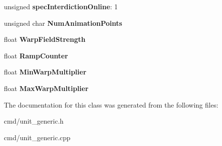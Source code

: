 \begin{DoxyCompactItemize}
\item 
unsigned {\bfseries spec\+Interdiction\+Online}\+: 1\hypertarget{classUnit_1_1graphic__options_aafc1aec33c1c1d82f469c841973ce62c}{}\label{classUnit_1_1graphic__options_aafc1aec33c1c1d82f469c841973ce62c}

\item 
unsigned char {\bfseries Num\+Animation\+Points}\hypertarget{classUnit_1_1graphic__options_a9da972a67195258177182e93b965cf62}{}\label{classUnit_1_1graphic__options_a9da972a67195258177182e93b965cf62}

\item 
float {\bfseries Warp\+Field\+Strength}\hypertarget{classUnit_1_1graphic__options_a6ab1cdcaef4cbbdfa1ca5d0053f6636c}{}\label{classUnit_1_1graphic__options_a6ab1cdcaef4cbbdfa1ca5d0053f6636c}

\item 
float {\bfseries Ramp\+Counter}\hypertarget{classUnit_1_1graphic__options_a5a4842b384c4919eaa97339771e59138}{}\label{classUnit_1_1graphic__options_a5a4842b384c4919eaa97339771e59138}

\item 
float {\bfseries Min\+Warp\+Multiplier}\hypertarget{classUnit_1_1graphic__options_a6eb3b539e3e6d465721ec76779bc24c7}{}\label{classUnit_1_1graphic__options_a6eb3b539e3e6d465721ec76779bc24c7}

\item 
float {\bfseries Max\+Warp\+Multiplier}\hypertarget{classUnit_1_1graphic__options_ae249f807b268c94dc717d024d949d62d}{}\label{classUnit_1_1graphic__options_ae249f807b268c94dc717d024d949d62d}

\end{DoxyCompactItemize}


The documentation for this class was generated from the following files\+:\begin{DoxyCompactItemize}
\item 
cmd/unit\+\_\+generic.\+h\item 
cmd/unit\+\_\+generic.\+cpp\end{DoxyCompactItemize}
